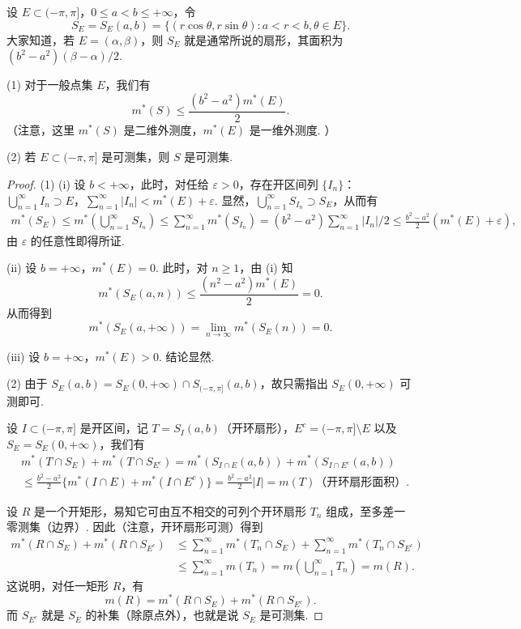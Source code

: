\documentclass[../../main.tex]{subfiles}%
\begin{document}
\begin{example}\label{example:极坐标变换与可测性}
设 \(E \subset (-\pi, \pi]\)，\(0 \leqslant a < b \leqslant +\infty\)，令
\[
S_E = S_E(a,b)=\{(r\cos\theta, r\sin\theta): a < r < b, \theta \in E\}.
\]
大家知道，若 \(E = (\alpha, \beta)\)，则 \(S_E\) 就是通常所说的扇形，其面积为 \((b^2 - a^2)(\beta - \alpha)/2\).

(1) 对于一般点集 \(E\)，我们有
\[
m^*(S) \leqslant \frac{(b^2 - a^2)m^*(E)}{2}.
\]
（注意，这里 \(m^*(S)\) 是二维外测度，\(m^*(E)\) 是一维外测度. ）

(2) 若 \(E \subset (-\pi, \pi]\) 是可测集，则 \(S\) 是可测集.
\end{example}
\begin{proof}

(1) (i) 设 \(b < +\infty\)，此时，对任给 \(\varepsilon > 0\)，存在开区间列 \(\{I_n\}\)：\(\bigcup_{n = 1}^{\infty} I_n \supset E\)，\(\sum_{n = 1}^{\infty}|I_n| < m^*(E) + \varepsilon\). 显然，\(\bigcup_{n = 1}^{\infty} S_{I_n} \supset S_E\)，从而有
\begin{align*}
m^*(S_E) \leqslant m^*\left(\bigcup_{n = 1}^{\infty} S_{I_n}\right) \leqslant \sum_{n = 1}^{\infty}m^*(S_{I_n})
= (b^2 - a^2)\sum_{n = 1}^{\infty}|I_n|/2 \leqslant \frac{b^2 - a^2}{2}(m^*(E) + \varepsilon),
\end{align*}
由 \(\varepsilon\) 的任意性即得所证.

(ii) 设 \(b = +\infty\)，\(m^*(E) = 0\). 此时，对 \(n \geqslant 1\)，由 (i) 知
\[
m^*(S_E(a,n)) \leqslant \frac{(n^2 - a^2)m^*(E)}{2} = 0.
\]
从而得到
\[
m^*(S_E(a, +\infty)) = \lim_{n \to \infty}m^*(S_E(n)) = 0.
\]

(iii) 设 \(b = +\infty\)，\(m^*(E) > 0\). 结论显然.

(2) 由于 \(S_E(a,b) = S_E(0, +\infty) \cap S_{(-\pi, \pi]}(a,b)\)，故只需指出 \(S_E(0, +\infty)\) 可测即可.

设 \(I \subset (-\pi, \pi]\) 是开区间，记 \(T = S_I(a,b)\)（开环扇形），\(E^c = (-\pi, \pi] \setminus E\) 以及 \(S_E = S_E(0, +\infty)\)，我们有
\begin{align*}
&m^*(T \cap S_E) + m^*(T \cap S_{E^c}) 
= m^*(S_{I \cap E}(a,b)) + m^*(S_{I \cap E^c}(a,b))\\
&\leqslant \frac{b^2 - a^2}{2}\{m^*(I \cap E) + m^*(I \cap E^c)\}
= \frac{b^2 - a^2}{2}|I| = m(T) \text{（开环扇形面积）}.
\end{align*}

设 \(R\) 是一个开矩形，易知它可由互不相交的可列个开环扇形 \(T_n\) 组成，至多差一零测集（边界）. 因此（注意，开环扇形可测）得到
\begin{align*}
m^*(R \cap S_E) + m^*(R \cap S_{E^c}) 
&\leqslant \sum_{n = 1}^{\infty}m^*(T_n \cap S_E) + \sum_{n = 1}^{\infty}m^*(T_n \cap S_{E^c})\\
&\leqslant \sum_{n = 1}^{\infty}m(T_n) = m\left(\bigcup_{n = 1}^{\infty} T_n\right) = m(R).
\end{align*}
这说明，对任一矩形 \(R\)，有
\[
m(R) = m^*(R \cap S_E) + m^*(R \cap S_{E^c}).
\]
而 \(S_{E^c}\) 就是 \(S_E\) 的补集（除原点外），也就是说 \(S_E\) 是可测集. 

\end{proof}
\end{document}
